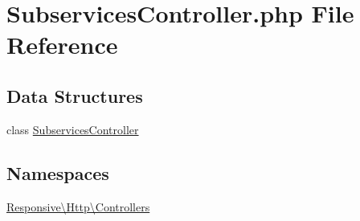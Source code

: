 \hypertarget{_subservices_controller_8php}{}\section{Subservices\+Controller.\+php File Reference}
\label{_subservices_controller_8php}
\subsection*{Data Structures}
\begin{DoxyCompactItemize}
\item 
class \mbox{\hyperlink{class_responsive_1_1_http_1_1_controllers_1_1_subservices_controller}{Subservices\+Controller}}
\end{DoxyCompactItemize}
\subsection*{Namespaces}
\begin{DoxyCompactItemize}
\item 
 \mbox{\hyperlink{namespace_responsive_1_1_http_1_1_controllers}{Responsive\textbackslash{}\+Http\textbackslash{}\+Controllers}}
\end{DoxyCompactItemize}
